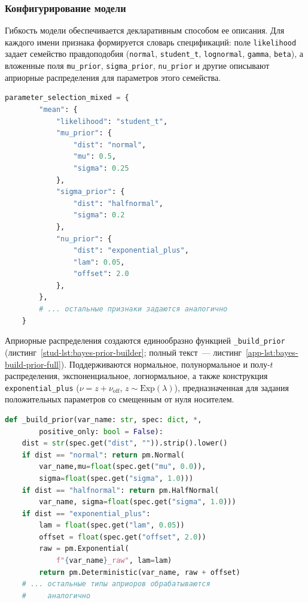 \documentclass[14pt]{mmcs_article}
\begin{document}
\subsubsection*{Конфигурирование модели}

Гибкость модели обеспечивается декларативным способом ее
описания. Для каждого имени признака формируется словарь
спецификаций: поле \texttt{likelihood} задает семейство
правдоподобия (\texttt{normal}, \texttt{student\_t},
\texttt{lognormal}, \texttt{gamma}, \texttt{beta}), а
вложенные поля \texttt{mu\_prior}, \texttt{sigma\_prior},
\texttt{nu\_prior} и другие описывают априорные распределения
для параметров этого семейства.

\begin{lstlisting}[language=Python, caption={Фрагмент задания семейств правдоподобий и априоров в ноутбуке эксперимента}, label=stud-lst:bayes-priors]
	parameter_selection_mixed = {
		"mean": {
			"likelihood": "student_t",
			"mu_prior": {
				"dist": "normal",
				"mu": 0.5,
				"sigma": 0.25
			},
			"sigma_prior": {
				"dist": "halfnormal",
				"sigma": 0.2
			},
			"nu_prior": {
				"dist": "exponential_plus",
				"lam": 0.05,
				"offset": 2.0
			},
		},
		# ... остальные признаки задаются аналогично
	}
\end{lstlisting}

Априорные распределения создаются единообразно функцией
\texttt{\_build\_prior} (листинг~\ref{stud-lst:bayes-prior-builder};
полный текст~--- листинг~\ref{app-lst:bayes-build-prior-full}).
Поддерживаются нормальное, полунормальное и полу-$t$
распределения, экспоненциальное, логнормальное, а также
конструкция \texttt{exponential\_plus}
($\nu = z+\nu_{\mathrm{off}}$, $z \sim \mathrm{Exp}(\lambda)$),
предназначенная для задания положительных параметров со
смещенным от нуля носителем.

\begin{lstlisting}[language=Python, caption={Создание априорной случайной величины по текстовой спецификации (\texttt{\_build\_prior})}, label=stud-lst:bayes-prior-builder]
def _build_prior(var_name: str, spec: dict, *,
		positive_only: bool = False):
	dist = str(spec.get("dist", "")).strip().lower()
	if dist == "normal": return pm.Normal(
		var_name,mu=float(spec.get("mu", 0.0)),
		sigma=float(spec.get("sigma", 1.0)))
	if dist == "halfnormal": return pm.HalfNormal(
		var_name, sigma=float(spec.get("sigma", 1.0)))
	if dist == "exponential_plus": 
		lam = float(spec.get("lam", 0.05))
		offset = float(spec.get("offset", 2.0))
		raw = pm.Exponential(
			f"{var_name}_raw", lam=lam)
		return pm.Deterministic(var_name, raw + offset)
	# ... остальные типы априоров обрабатываются
	#     аналогично
\end{lstlisting}
\end{document}
